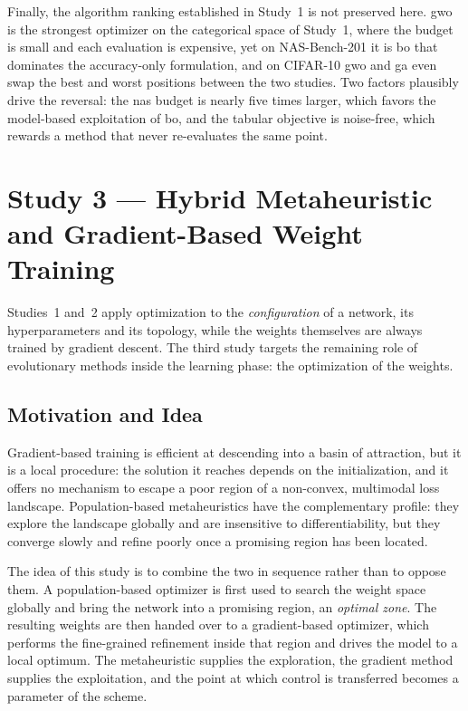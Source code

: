 Finally, the algorithm ranking established in Study~1 is not preserved here. \acrshort{gwo} is the strongest optimizer on the categorical space of Study~1, where the budget is small and each evaluation is expensive, yet on NAS-Bench-201 it is \acrshort{bo} that dominates the accuracy-only formulation, and on CIFAR-10 \acrshort{gwo} and \acrshort{ga} even swap the best and worst positions between the two studies. Two factors plausibly drive the reversal: the \acrshort{nas} budget is nearly five times larger, which favors the model-based exploitation of \acrshort{bo}, and the tabular objective is noise-free, which rewards a method that never re-evaluates the same point.

\clearpage
\section{Study 3 --- Hybrid Metaheuristic and Gradient-Based Weight Training}
\label{sec:study_3}

Studies~1 and~2 apply optimization to the \emph{configuration} of a network, its hyperparameters and its topology, while the weights themselves are always trained by gradient descent. The third study targets the remaining role of evolutionary methods inside the learning phase: the optimization of the weights.

\subsection{Motivation and Idea}
\label{subsec:study3_idea}

Gradient-based training is efficient at descending into a basin of attraction, but it is a local procedure: the solution it reaches depends on the initialization, and it offers no mechanism to escape a poor region of a non-convex, multimodal loss landscape. Population-based metaheuristics have the complementary profile: they explore the landscape globally and are insensitive to differentiability, but they converge slowly and refine poorly once a promising region has been located.

The idea of this study is to combine the two in sequence rather than to oppose them. A population-based optimizer is first used to search the weight space globally and bring the network into a promising region, an \emph{optimal zone}. The resulting weights are then handed over to a gradient-based optimizer, which performs the fine-grained refinement inside that region and drives the model to a local optimum. The metaheuristic supplies the exploration, the gradient method supplies the exploitation, and the point at which control is transferred becomes a parameter of the scheme.


